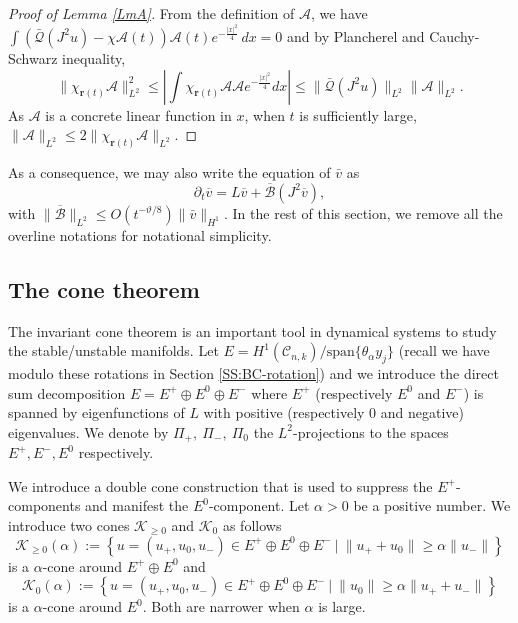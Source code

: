 \documentclass[11pt]{amsart}
\numberwithin{equation}{section}
\numberwithin{equation}{section}
\newcommand{\br}{\mathbf{r}}
\newcommand{\cA}{\mathcal{A}}
\newcommand{\cB}{\mathcal{B}}
\newcommand{\cC}{\mathcal{C}}
\newcommand{\cK}{\mathcal{K}}
\newcommand{\cQ}{\mathcal{Q}}
\newcommand{\pr}{\partial}
\begin{document}
	\begin{proof}[Proof of Lemma \ref{LmA}] 
		From the definition of $\cA$, we have 
		$\int (\bar{\cQ}(J^2u)-\chi\cA(t))\cA(t)e^{-\frac{|x|^2}{4}}\,dx=0$
		and by Plancherel and Cauchy-Schwarz inequality,
		\begin{equation}\label{EqRotation}
			\|\chi_{\br(t)}\cA\|_{L^2}^2\leq \left|\int \chi_{\br(t)}\cA\cA e^{-\frac{|x|^2}{4}} dx\right|\leq \|\bar{\cQ}(J^2u)\|_{L^2}\|\cA\|_{L^2}. 	
		\end{equation}
		As $\cA$ is a concrete linear function in $x$, when $t$ is sufficiently large, $\|\cA\|_{L^2}\leq 2\|\chi_{\br(t)}\cA\|_{L^2}$. 
	\end{proof}
	
	
	As a consequence, we may also write the equation of $\bar v$ as 
	\begin{equation}\label{eq:bar equation after reduction}
		\pr_t \overline{v}=L\overline{v}+\overline{\cB}(J^2\overline{v}),
	\end{equation}
	with $\|\overline{\cB}\|_{L^2}\leq O(t^{-\vartheta/8})\|\bar v\|_{H^1}$. In the rest of this section, we remove all the overline notations for notational simplicity.
	
	
	
	
	
	
	\subsection{The cone theorem}
	The invariant cone theorem is an important tool in dynamical systems to study the stable/unstable manifolds. Let $E=H^1(\cC_{n,k})/\text{span}\{\theta_\alpha y_j\}$ (recall we have modulo these rotations in Section \ref{SS:BC-rotation}) and we introduce the direct sum decomposition $E=E^+\oplus E^0\oplus E^-$ where $E^+$ (respectively $E^0$ and $E^-$) is spanned by eigenfunctions of $L$ with positive (respectively $0$ and negative) eigenvalues. We denote by $\Pi_+,\ \Pi_-,\ \Pi_0$ the $L^2$-projections to the spaces $E^+, E^-, E^0 $ respectively. 
	
	We introduce a double cone construction that is used to suppress the $E^+$-components and manifest the $E^0$-component. Let $\alpha>0$ be a positive number. We introduce two cones $\cK_{\geq 0}$ and $\cK_{0}$ as follows
	$$\cK_{\geq 0}(\alpha):=\left\{u=(u_+,u_0,u_-)\in E^+\oplus E^0\oplus E^-\ |\ \|u_++u_0\|\geq \alpha\|u_-\|\right\}$$
	is a $\alpha$-cone around $E^+\oplus E^0$
	and 
	$$\cK_{0}(\alpha):=\left\{u=(u_+,u_0,u_-)\in E^+\oplus E^0\oplus E^-\ |\ \|u_0\|\geq 
	\alpha\|u_++u_-\|\right\}$$
	is a $\alpha$-cone around $ E^0$. Both are narrower when $\alpha$ is large. 
	
\end{document}
